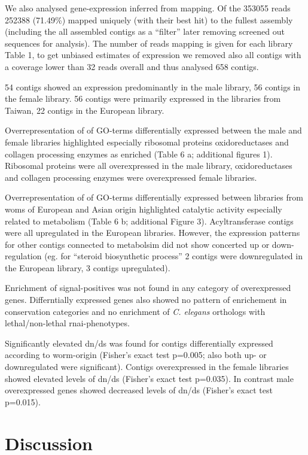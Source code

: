 \documentclass[10pt]{bmc_article}
\newenvironment{bmcformat}{\begin{raggedright}\baselineskip20pt\sloppy\setboolean{publ}{false}}{\end{raggedright}\baselineskip20pt\sloppy}
\begin{document}
\begin{bmcformat}
We also analysed gene-expression inferred from mapping. Of the
353055 reads 252388
(71.49\%) mapped uniquely
(with their best hit) to the fullest assembly (including the all
assembled contigs as a ``filter'' later removing screened out
sequences for analysis). The number of reads mapping is given for each
library Table 1, to get unbiased estimates of expression we removed
also all contigs with a coverage lower than 32 reads overall and thus
analysed 658 contigs.

54 contigs
showed an expression predominantly in the male library,
56 contigs in
the female
library. 56
contigs were primarily expressed in the libraries from Taiwan,
22 contigs in
the European library.

Overrepresentation of of GO-terms differentially expressed between the
male and female libraries highlighted especially ribosomal proteins
oxidoreductases and collagen processing enzymes as enriched (Table 6
a; additional figures 1). Ribosomal proteins were all overexpressed in the male library,
oxidoreductases and collagen processing enzymes were overexpressed
female libraries.

Overrepresentation of of GO-terms differentially expressed between
libraries from woms of European and Asian origin highlighted catalytic
activity especially related to metabolism (Table 6 b; additional
Figure 3).  Acyltransferase contigs were all upregulated in the
European libraries. However, the expression patterns for other contigs
connected to metabolsim did not show concerted up or down-regulation
(eg. for ``steroid biosynthetic process'' 2 contigs were downregulated
in the European library, 3 contigs upregulated).

Enrichment of signal-positives was not found in any category of
overexpressed genes. Differntially expressed genes also showed no
pattern of enrichement in conservation categories and no enrichment of
\textit{C. elegans} orthologs with lethal/non-lethal rnai-phenotypes.

Significantly elevated dn/ds was found for contigs differentially
expressed according to worm-origin (Fisher's exact test
p=0.005; also both up- or
downregulated were significant). Contigs overexpressed in the female
libraries showed elevated levels of dn/ds (Fisher's exact test
p=0.035). In contrast male
overexpressed genes showed decreased levels of dn/ds (Fisher's exact
test p=0.015).


\section*{Discussion}


\end{bmcformat}
\end{document}

